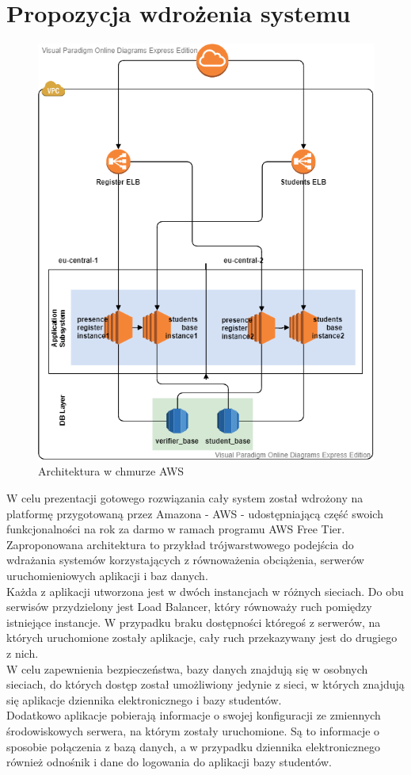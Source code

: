 \documentclass[declaration,shortabstract, mgr]{iithesis}
\begin{document}
\section{Propozycja wdrożenia systemu}
\begin{figure}[h]
\caption{Architektura w chmurze AWS}
\centering
\includegraphics[scale=0.6]{AWS.png}
\end{figure}
\indent W celu prezentacji gotowego rozwiązania cały system został wdrożony na platformę przygotowaną przez Amazona - AWS\cite{aws} - udostępniającą część swoich funkcjonalności na rok za darmo w ramach programu AWS Free Tier. \\
\indent Zaproponowana architektura to przykład trójwarstwowego podejścia do wdrażania systemów korzystających z równoważenia obciążenia, serwerów uruchomieniowych aplikacji i baz danych. \\
\indent Każda z aplikacji utworzona jest w dwóch instancjach w różnych sieciach. Do obu serwisów przydzielony jest Load Balancer, który równoważy ruch pomiędzy istniejące instancje. W przypadku braku dostępności któregoś z serwerów, na których uruchomione zostały aplikacje, cały ruch przekazywany jest do drugiego z nich.\\
\indent W celu zapewnienia bezpieczeństwa, bazy danych znajdują się w osobnych sieciach, do których dostęp został umożliwiony jedynie z sieci, w których znajdują się aplikacje dziennika elektronicznego i bazy studentów. \\
\indent Dodatkowo aplikacje pobierają informacje o swojej konfiguracji ze zmiennych środowiskowych serwera, na którym zostały uruchomione. Są to informacje o sposobie połączenia z bazą danych, a w przypadku dziennika elektronicznego również odnośnik i dane do logowania do aplikacji bazy studentów.
\end{document}

